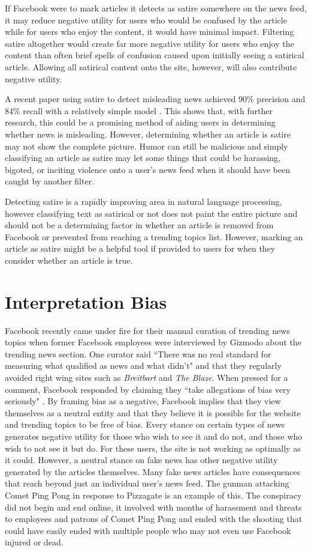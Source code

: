 \documentclass[12pt]{article}
\begin{document}
If Facebook were to mark articles it detects as satire somewhere on the news feed, it may reduce negative utility for users who would be confused by the article while for users who enjoy the content, it would have minimal impact. Filtering satire altogether would create far more negative utility for users who enjoy the content than often brief spells of confusion caused upon initially seeing a satirical article. Allowing all satirical content onto the site, however, will also contribute negative utility.

A recent paper using satire to detect misleading news achieved 90\% precision and 84\% recall with a relatively simple model \citep{satire_detection}. This shows that, with further research, this could be a promising method of aiding users in determining whether news is misleading. However, determining whether an article is satire may not show the complete picture. Humor can still be malicious and simply classifying an article as satire may let some things that could be harassing, bigoted, or inciting violence onto a user's news feed when it should have been caught by another filter.

Detecting satire is a rapidly improving area in natural language processing, however classifying text as satirical or not does not paint the entire picture and should not be a determining factor in whether an article is removed from Facebook or prevented from reaching a trending topics list. However, marking an article as satire might be a helpful tool if provided to users for when they consider whether an article is true.


\section{Interpretation Bias}
Facebook recently came under fire for their manual curation of trending news topics when former Facebook employees were interviewed by Gizmodo about the trending news section. One curator said ``There was no real standard for measuring what qualified as news and what didn't" and that they regularly avoided right wing sites such as \textit{Breitbart} and \textit{The Blaze}. When pressed for a comment, Facebook responded by claiming they ``take allegations of bias very seriously" \citep{gizmodo_fb_news_curation}. By framing bias as a negative, Facebook implies that they view themselves as a neutral entity and that they believe it is possible for the website and trending topics to be free of bias. Every stance on certain types of news generates negative utility for those who wish to see it and do not, and those who wish to not see it but do. For these users, the site is not working as optimally as it could. However, a neutral stance on fake news has other negative utility generated by the articles themselves. Many fake news articles have consequences that reach beyond just an individual user's news feed. The gunman attacking Comet Ping Pong in response to Pizzagate is an example of this. The conspiracy did not begin and end online, it involved with months of harassment and threats to employees and patrons of Comet Ping Pong and ended with the shooting that could have easily ended with multiple people who may not even use Facebook injured or dead.
\end{document}

